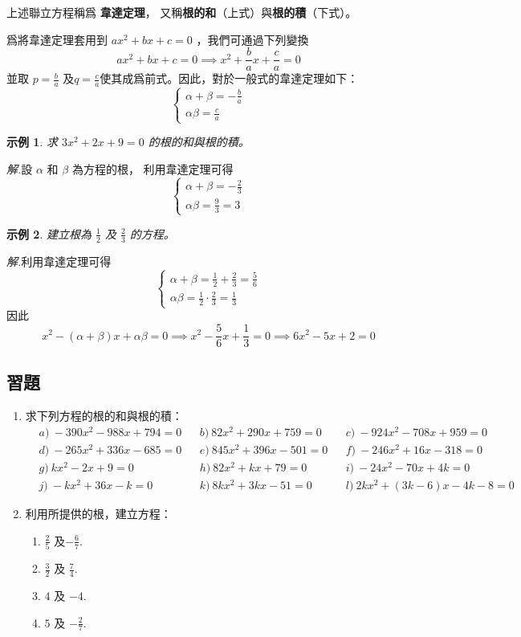 \documentclass[12pt]{article}
\newtheorem{example}{示例}
\begin{document}
    上述聯立方程稱爲 \textbf{韋達定理}， 又稱\textbf{根的和}（上式）與\textbf{根的積}（下式）。

    爲將韋達定理套用到 $ax^2+bx+c=0$ ，我們可通過下列變換 $$ax^2+bx+c=0 \implies x^2+\frac{b}{a}x+\frac{c}{a}=0$$ 並取 $p=\frac{b}{a}$ 及$q=\frac{c}{a}$使其成爲前式。因此，對於一般式的韋達定理如下： $$\begin{cases}
        \alpha+\beta=-\frac{b}{a}\\ 
        \alpha\beta=\frac{c}{a}
    \end{cases}$$

    \begin{example}
        求 $3x^2+2x+9=0$ 的根的和與根的積。
    \end{example}

    \textit{ 解.}設 $\alpha$ 和 $\beta$ 為方程的根， 利用韋達定理可得 $$\begin{cases}
        \alpha+\beta=-\frac{2}{3}\\ 
        \alpha\beta=\frac{9}{3}=3
    \end{cases}$$

    \begin{example}
       建立根為 $\frac{1}{2}$ 及 $\frac{2}{3}$ 的方程。
    \end{example}

    \textit{ 解.}利用韋達定理可得 $$\begin{cases}
        \alpha+\beta=\frac{1}{2}+\frac{2}{3}=\frac{5}{6}\\ 
        \alpha\beta=\frac{1}{2}\cdot \frac{2}{3}=\frac{1}{3}
    \end{cases}$$
    \indent \indent 因此 $$x^2-(\alpha+\beta)x+\alpha\beta=0 \implies x^2-\frac{5}{6}x+\frac{1}{3}=0 \implies 6x^2-5x+2=0$$

    \subsection*{習題}
    \begin{enumerate}
        \item 求下列方程的根的和與根的積：\begin{align*}
            &a)\ -390x^2-988x+794=0&&b)\ 82x^2+290x+759=0&&c)\ -924x^2-708x+959=0\\
            &d)\ -265x^2+336x-685=0&&e)\ 845x^2+396x-501=0&&f)\ -246x^2+16x-318=0\\
            &g)\ kx^2-2x+9=0&&h)\ 82x^2+kx+79=0&&i)\ -24x^2-70x+4k=0\\
            &j)\ -kx^2+36x-k=0&&k)\ 8kx^2+3kx-51=0&&l)\ 2kx^2+(3k-6)x-4k-8=0
        \end{align*}
        \item 利用所提供的根，建立方程：\begin{enumerate}
            \item $\frac{2}{5}$ 及$-\frac{6}{7}$.
            \item $\frac{3}{2}$ 及 $\frac{7}{4}$.
            \item $4$ 及 $-4$.
            \item $5$ 及 $-\frac{2}{7}$.
        \end{enumerate}
    \end{enumerate}
\end{document}
